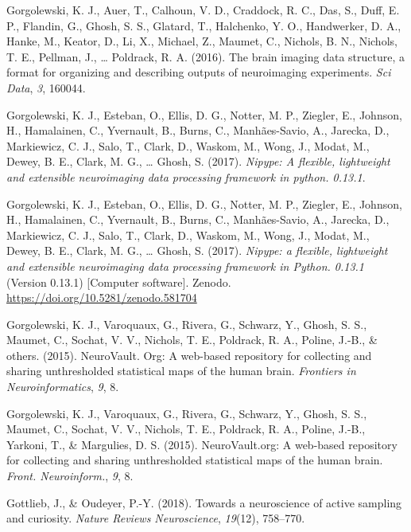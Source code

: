 \documentclass[12pt,american,a4paper,oneside,]{memoir} %
\begin{document}
\leavevmode\hypertarget{ref-Gorgolewski2016-in}{}%
Gorgolewski, K. J., Auer, T., Calhoun, V. D., Craddock, R. C., Das, S., Duff, E. P., Flandin, G., Ghosh, S. S., Glatard, T., Halchenko, Y. O., Handwerker, D. A., Hanke, M., Keator, D., Li, X., Michael, Z., Maumet, C., Nichols, B. N., Nichols, T. E., Pellman, J., \ldots{} Poldrack, R. A. (2016). The brain imaging data structure, a format for organizing and describing outputs of neuroimaging experiments. \emph{Sci Data}, \emph{3}, 160044.

\leavevmode\hypertarget{ref-Gorgolewski2017-gb}{}%
Gorgolewski, K. J., Esteban, O., Ellis, D. G., Notter, M. P., Ziegler, E., Johnson, H., Hamalainen, C., Yvernault, B., Burns, C., Manhães-Savio, A., Jarecka, D., Markiewicz, C. J., Salo, T., Clark, D., Waskom, M., Wong, J., Modat, M., Dewey, B. E., Clark, M. G., \ldots{} Ghosh, S. (2017). \emph{Nipype: A flexible, lightweight and extensible neuroimaging data processing framework in python. 0.13.1}.

\leavevmode\hypertarget{ref-gorgolewski_krzysztof_j_2017_581704}{}%
Gorgolewski, K. J., Esteban, O., Ellis, D. G., Notter, M. P., Ziegler, E., Johnson, H., Hamalainen, C., Yvernault, B., Burns, C., Manhães-Savio, A., Jarecka, D., Markiewicz, C. J., Salo, T., Clark, D., Waskom, M., Wong, J., Modat, M., Dewey, B. E., Clark, M. G., \ldots{} Ghosh, S. (2017). \emph{Nipype: a flexible, lightweight and extensible neuroimaging data processing framework in Python. 0.13.1} (Version 0.13.1) {[}Computer software{]}. Zenodo. \url{https://doi.org/10.5281/zenodo.581704}

\leavevmode\hypertarget{ref-gorgolewski2015neurovault}{}%
Gorgolewski, K. J., Varoquaux, G., Rivera, G., Schwarz, Y., Ghosh, S. S., Maumet, C., Sochat, V. V., Nichols, T. E., Poldrack, R. A., Poline, J.-B., \& others. (2015). NeuroVault. Org: A web-based repository for collecting and sharing unthresholded statistical maps of the human brain. \emph{Frontiers in Neuroinformatics}, \emph{9}, 8.

\leavevmode\hypertarget{ref-Gorgolewski2015-hj}{}%
Gorgolewski, K. J., Varoquaux, G., Rivera, G., Schwarz, Y., Ghosh, S. S., Maumet, C., Sochat, V. V., Nichols, T. E., Poldrack, R. A., Poline, J.-B., Yarkoni, T., \& Margulies, D. S. (2015). NeuroVault.org: A web-based repository for collecting and sharing unthresholded statistical maps of the human brain. \emph{Front. Neuroinform.}, \emph{9}, 8.

\leavevmode\hypertarget{ref-gottlieb2018towards}{}%
Gottlieb, J., \& Oudeyer, P.-Y. (2018). Towards a neuroscience of active sampling and curiosity. \emph{Nature Reviews Neuroscience}, \emph{19}(12), 758--770.
\end{document}
